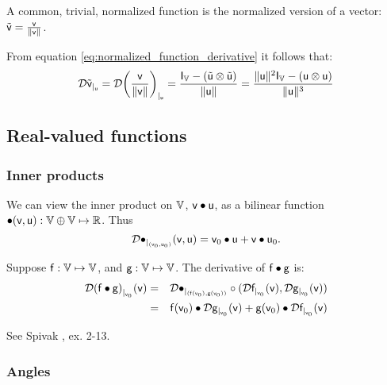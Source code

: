 A common, trivial, normalized function is the normalized version of
a vector: $\tilde{\mathsf{v}} =  \frac{\mathsf{v}}{ \| \mathsf{v} \| }$.

From equation \ref{eq:normalized_function_derivative}
it follows that:
\begin{equation}
\label{eq:normalized_vector_derivative}
{\mathcal{D}{\tilde{\mathsf{v}}}_{\mid_{\mathsf{u}}}}
 =
{\mathcal{D}{ \left( \frac{\mathsf{v}}{ \| \mathsf{v} \| } \right) }_{\mid_{\mathsf{u}}}}
 =
\frac{\mathsf{I}_{\mathbb{V}} - \left( \tilde{\mathsf{u}} \otimes \tilde{\mathsf{u}} \right) }
{ \| \mathsf{u} \| }
 =
\frac{\| \mathsf{u} \|^2 \mathsf{I}_{\mathbb{V}} - \left( \mathsf{u} \otimes \mathsf{u} \right) }
{\| \mathsf{u} \|^3}
\end{equation}


\subsection{Real-valued functions}
\label{sec:Real-valued-functions}


\subsubsection{Inner products}
\label{sec:Inner-products}

We can view the inner product on $\mathbb{V}$, $\mathsf{v} \bullet \mathsf{u}$,
as a bilinear function $\bullet(\mathsf{v},\mathsf{u}) : \mathbb{V} \oplus \mathbb{V} \mapsto \mathbb{R}$.
Thus
\begin{equation}
{\mathcal{D}{\bullet}_{\mid_{(\mathsf{v}_0,\mathsf{u}_0)}}({\mathsf{v},\mathsf{u}})} = \mathsf{v}_0 \bullet \mathsf{u} + \mathsf{v} \bullet \mathsf{u}_0.
\end{equation}

Suppose
$\mathsf{f}:\mathbb{V} \mapsto \mathbb{V}$, and
$\mathsf{g}:\mathbb{V} \mapsto \mathbb{V}$.
The derivative of $\mathsf{f} \bullet \mathsf{g}$ is:
\begin{eqnarray}
\label{eq:dot_derivative}
{\mathcal{D}{(\mathsf{f}\bullet \mathsf{g})}_{\mid_{\mathsf{v}_0}}({\mathsf{v}})}
& =
& {\mathcal{D}{\bullet}_{\mid_{(\mathsf{f}(\mathsf{v}_0),\mathsf{g}(\mathsf{v}_0))}}} \circ ({\mathcal{D}{\mathsf{f}}_{\mid_{\mathsf{v}_0}}({\mathsf{v}})}, {\mathcal{D}{\mathsf{g}}_{\mid_{\mathsf{v}_0}}({\mathsf{v}})})
\\
& =
& \mathsf{f}(\mathsf{v}_0) \bullet {\mathcal{D}{\mathsf{g}}_{\mid_{\mathsf{v}_0}}({\mathsf{v}})}  +  \mathsf{g}(\mathsf{v}_0) \bullet {\mathcal{D}{\mathsf{f}}_{\mid_{\mathsf{v}_0}}({\mathsf{v}})} \nonumber
\end{eqnarray}

See Spivak \cite{spivak-1965}, ex. 2-13.


\subsubsection{Angles}
\label{sec:Angles}

